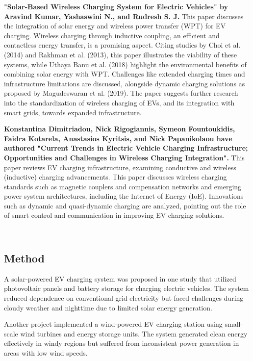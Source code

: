 \documentclass[12pt]{report}
\begin{document}
\begin{Certificatepage}
\begin{center}
\begin{justify}
\vspace{10pt}
\textbf{"Solar-Based Wireless Charging System for Electric Vehicles" by Aravind Kumar, Yashaswini N., and Rudresh S. J.} This paper 
discusses the integration of solar energy and wireless power transfer (WPT) for EV charging. Wireless charging through inductive 
coupling, an efficient and contactless energy transfer, is a promising aspect. Citing studies by Choi et al. (2014) and Rakhman et al. 
(2013), this paper illustrates the viability of these systems, while Uthaya Banu et al. (2018) highlight the environmental benefits of 
combining solar energy with WPT. Challenges like extended charging times and infrastructure limitations are discussed, alongside 
dynamic charging solutions as proposed by Magudeswaran et al. (2019). The paper suggests further research into the standardization 
of wireless charging of EVs, and its integration with smart grids, towards expanded infrastructure.

\vspace{10pt}
\textbf{Konstantina Dimitriadou, Nick Rigogiannis, Symeon Fountoukidis, Faidra Kotarela, Anastasios Kyritsis, and Nick Papanikolaou 
have authored "Current Trends in Electric Vehicle Charging Infrastructure; Opportunities and Challenges in Wireless Charging 
Integration".} This paper reviews EV charging infrastructure, examining conductive and wireless (inductive) charging advancements. 
This paper discusses wireless charging standards such as magnetic couplers and compensation networks and emerging power system 
architectures, including the Internet of Energy (IoE). Innovations such as dynamic and quasi-dynamic charging are analyzed, 
pointing out the role of smart control and communication in improving EV charging solutions. 

\vspace{40pt}
\\
\subsection{Method }
\label{met1}
A solar-powered EV charging system was proposed in one study that utilized photovoltaic panels and battery storage for charging electric vehicles. The system reduced dependence on conventional grid electricity but faced challenges during cloudy weather and nighttime due to limited solar energy generation.

\vspace{10pt}
Another project implemented a wind-powered EV charging station using small-scale wind turbines and energy storage units. The system generated clean energy effectively in windy regions but suffered from inconsistent power generation in areas with low wind speeds.


\end{justify}
\end{center}
\end{Certificatepage}
\end{document}
